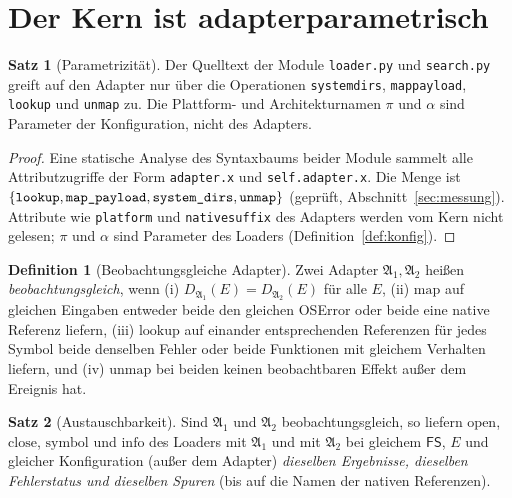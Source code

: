 \documentclass[a4paper,12pt,twoside]{report}
\DeclareRobustCommand{\_}{\ifmmode\mbox{\textunderscore}\else\textunderscore\allowbreak{}\fi}
\theoremstyle{definition}
\newtheorem{definition}{Definition}[chapter]
\newtheorem{satz}{Satz}[chapter]
\newcommand{\FS}{\mathsf{FS}}
\begin{document}
\section{Der Kern ist adapterparametrisch}

\begin{satz}[Parametrizität]
	\label{satz:param}
	Der Quelltext der Module \texttt{loader.py} und \texttt{search.py} greift auf den Adapter nur über die Operationen \texttt{system\_dirs}, \texttt{map\_payload}, \texttt{lookup} und \texttt{unmap} zu. Die Plattform- und Architekturnamen $\pi$ und $\alpha$ sind Parameter der Konfiguration, nicht des Adapters.
\end{satz}

\begin{proof}
	Eine statische Analyse des Syntaxbaums beider Module sammelt alle Attributzugriffe der Form \texttt{adapter.x} und \texttt{self.adapter.x}. Die Menge ist $\{\texttt{lookup},\texttt{map\_payload},\texttt{system\_dirs},\texttt{unmap}\}$ (geprüft, Abschnitt~\ref{sec:messung}). Attribute wie \texttt{platform} und \texttt{native\_suffix} des Adapters werden vom Kern nicht gelesen; $\pi$ und $\alpha$ sind Parameter des Loaders (Definition~\ref{def:konfig}).
\end{proof}

\begin{definition}[Beobachtungsgleiche Adapter]
	Zwei Adapter $\mathfrak A_1,\mathfrak A_2$ heißen \emph{beobachtungsgleich}, wenn (i) $D_{\mathfrak A_1}(E)=D_{\mathfrak A_2}(E)$ für alle $E$, (ii) $\mathrm{map}$ auf gleichen Eingaben entweder beide den gleichen OSError oder beide eine native Referenz liefern, (iii) $\mathrm{lookup}$ auf einander entsprechenden Referenzen für jedes Symbol beide denselben Fehler oder beide Funktionen mit gleichem Verhalten liefern, und (iv) $\mathrm{unmap}$ bei beiden keinen beobachtbaren Effekt außer dem Ereignis hat.
\end{definition}

\begin{satz}[Austauschbarkeit]
	\label{satz:austausch}
	Sind $\mathfrak A_1$ und $\mathfrak A_2$ beobachtungsgleich, so liefern $\mathrm{open}$, $\mathrm{close}$, $\mathrm{symbol}$ und $\mathrm{info}$ des Loaders mit $\mathfrak A_1$ und mit $\mathfrak A_2$ bei gleichem $\FS$, $E$ und gleicher Konfiguration (außer dem Adapter) \emph{dieselben Ergebnisse, dieselben Fehlerstatus und dieselben Spuren} (bis auf die Namen der nativen Referenzen).
\end{satz}
\end{document}
